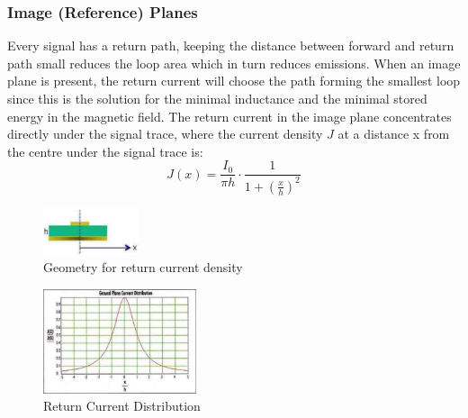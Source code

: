 		\subsubsection{Image (Reference) Planes}
		Every signal has a return path, keeping the distance between forward and return path small reduces the loop area which in turn reduces emissions. When an image plane is present, the return current will choose the path forming the smallest loop since this is the solution for the minimal inductance and the minimal stored energy in the magnetic field. The return current in the image plane concentrates directly under the signal trace, where the current density $J$ at a distance x from the centre under the signal trace is:  
		\begin{equation}
			J(x) = \frac{I_0}{\pi h} \cdot \frac{1}{1+\left(\frac{x}{h}\right)^2}
		\end{equation}
		\begin{figure}[h!]
			\centering
			\includegraphics[width=0.25\textwidth]{images/ReturnCurrentGeometry.png}
			\caption{Geometry for return current density}
			\label{Fig:ReturnCurrentGeometry}
		\end{figure}
		\begin{figure}[h!]
			\centering
			\includegraphics[width=0.4\textwidth]{images/ReturnCurrentDensity.png}
			\caption{Return Current Distribution}
			\label{Fig:ReturnCurrentDensity}
		\end{figure}
		\\
	
